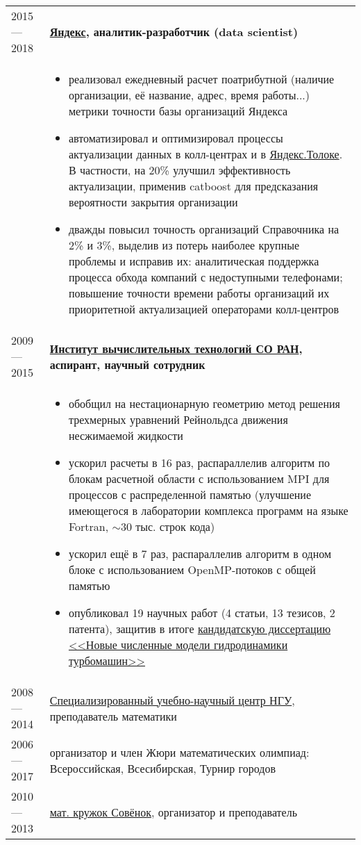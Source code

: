 \documentclass[11pt]{article}
\begin{document}
\newpage
\begin{longtable} {l | p{}}

2015 — 2018 & {\textbf{\href{https://yandex.ru/}{Яндекс}, аналитик-разработчик (data scientist)}} \\
&
\begin{itemize}
	\item реализовал ежедневный расчет поатрибутной (наличие организации, её название, адрес, время работы...) метрики точности базы организаций Яндекса
	\item автоматизировал и оптимизировал процессы актуализации данных в колл-центрах и в \href{https://toloka.yandex.ru}{Яндекс.Толоке}. В частности, на 20\% улучшил эффективность актуализации, применив catboost для предсказания вероятности закрытия организации
	\item дважды повысил точность организаций Справочника на 2\% и 3\%, выделив из потерь наиболее крупные проблемы и исправив их: аналитическая поддержка процесса обхода компаний с недоступными телефонами; повышение точности времени работы организаций их приоритетной актуализацией операторами колл-центров
\end{itemize}
\\

2009 — 2015 & {\textbf{\href{http://www.ict.nsc.ru}{Институт вычислительных технологий СО РАН}, аспирант, научный сотрудник}}\\
&
\begin{itemize}
	\item обобщил на нестационарную геометрию метод решения трехмерных уравнений Рейнольдса движения несжимаемой жидкости
	\item ускорил расчеты в 16 раз, распараллелив алгоритм по блокам расчетной области с использованием MPI для процессов с распределенной памятью (улучшение имеющегося в лаборатории комплекса программ на языке Fortran, $\sim$30 тыс. строк кода)
	\item ускорил ещё в 7 раз, распараллелив алгоритм в одном блоке с использованием OpenMP-потоков с общей памятью
	\item опубликовал 19 научных работ (4 статьи, 13 тезисов, 2 патента), защитив в итоге \href{https://github.com/avalur/dissertation/blob/master/to_print/autoref_Avdyushenko.pdf}{кандидатскую диссертацию <<Новые численные модели гидродинамики турбомашин>>}
\end{itemize}
\\

2008 — 2014 & {\href{http://sesc.nsu.ru}{Специализированный учебно-научный центр НГУ}, преподаватель математики}\\
2006 — 2017 & {организатор и член Жюри математических олимпиад: Всероссийская, Всесибирская, Турнир городов}\\
2010 — 2013 & {\href{https://www.sovenok.academy/}{мат. кружок Совёнок}, организатор и преподаватель}\\

\end{longtable}
\end{document}
